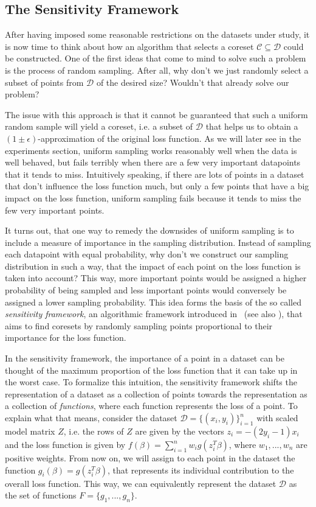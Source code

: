 \subsection{The Sensitivity Framework}

After having imposed some reasonable restrictions on the
datasets under study, it is now time to think about
how an algorithm that selects a coreset
$\mathcal{C} \subseteq \mathcal{D}$ could be constructed.
One of the first ideas that come to mind to solve such a problem
is the process of random sampling.
After all, why don't we just randomly select a subset of
points from $\mathcal{D}$ of the desired size?
Wouldn't that already solve our problem?

The issue with this approach is that it cannot be guaranteed
that such a uniform random sample will yield a coreset,
i.e. a subset of $\mathcal{D}$ that helps us to obtain a
$(1 \pm \epsilon)$-approximation of the original loss function.
As we will later see in the experiments section, uniform sampling
works reasonably well when the data is well behaved, but fails
terribly when there are a few very important datapoints that
it tends to miss.
Intuitively speaking,
if there are lots of points in a dataset that don't influence the
loss function much, but only a few points that have a big impact
on the loss function, uniform sampling fails because it tends
to miss the few very important points.

It turns out, that one way to remedy the downsides of uniform sampling
is to include a measure of importance in the sampling distribution.
Instead of sampling each datapoint with equal probability,
why don't we construct our sampling distribution in such a way,
that the impact of each point on the loss function is taken into
account? This way, more important points would be assigned
a higher probability of being sampled and less important points
would conversely be assigned a lower sampling probability.
This idea forms the basis of the so called
\textit{sensitivity framework}, an algorithmic framework
introduced in~\cite{feldman-langberg-coresets}
(see also \cite{big-data-tiny-data}), that aims to
find coresets by randomly sampling points proportional to
their importance for the loss function.

In the sensitivity framework, the importance of a point
in a dataset can be thought of the maximum proportion of
the loss function that it can take up in the worst case.
To formalize this intuition, the sensitivity framework shifts
the representation of a dataset as a collection of
points towards the representation as a collection of
\textit{functions}, where each function represents the
loss of a point.
To explain what that means, consider the dataset
$\mathcal{D} = \{(x_i, y_i)\}_{i=1}^n$ with scaled model
matrix $Z$, i.e. the rows of $Z$ are given by the vectors
$z_i = -(2y_i-1)x_i$ and the loss function is given by
$f(\beta) = \sum_{i=1}^n w_ig(z_i^T\beta)$, where
$w_1, ..., w_n$ are positive weights.
From now on, we will assign to each point in the dataset the
function $g_i(\beta) = g(z_i^T\beta)$, that represents its
individual contribution to the overall loss function.
This way, we can equivalently represent the dataset $\mathcal{D}$
as the set of functions $F = \{g_1, ..., g_n\}$.

